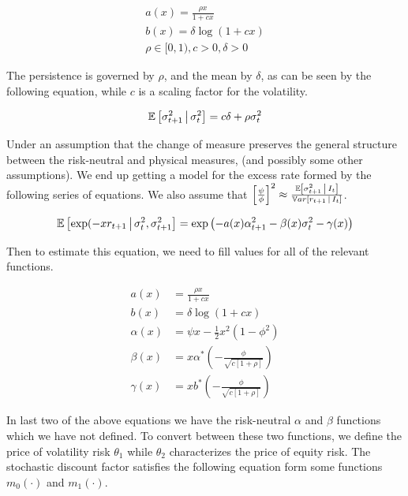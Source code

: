 \documentclass[11pt]{article}
\newcommand*{\E}{\mathbb{E}}
\newcommand*{\Var}{\mathbb{V}ar}
\newcommand{\mvert}[1][\middle]{\ensuremath{\,#1\vert\,}}
\begin{document}
\begin{gather}
    a(x) = \frac{\rho x}{1 + c x}  \\
    b(x) = \delta \log \left(1 + c x\right) \\
    \rho \in [0, 1), c > 0, \delta > 0 
\end{gather}

The persistence is governed by $\rho$, and the mean by $\delta$, as can be seen by the following equation, while
$c$ is a scaling factor for the volatility. 

\begin{equation}
    \E\left[\sigma^2_{t+1} \mvert \sigma^2_t\right] = c \delta + \rho \sigma^2_t
\end{equation}

Under an assumption that the change of measure preserves the general structure between the risk-neutral and
physical measures, (and possibly some other assumptions).
We end up getting a model for the excess rate formed by the following series of equations.   
We also assume that $\left[ \frac{\psi}{\phi} \right]^2 \approx \frac{\E \left[\sigma^2_{t+1} \mvert
I_t\right]}{\Var\left[r_{t+1} \mvert I_t\right]}$.

\begin{equation}
    \E\left[\exp(-x r_{t+1} \mvert \sigma_t^2, \sigma^2_{t+1}\right] = \exp\left(- a(x) \alpha^2_{t+1} - \beta(x)
        \sigma^2_t - \gamma(x) \right) 
\end{equation}

Then to estimate this equation, we need to fill values for all of the relevant functions.


\begin{align}
    a(x) &= \frac{\rho x}{1 + c x} \\
    b(x) &= \delta \log \left(1 + c x\right) \\
    \alpha(x) &= \psi x - \frac{1}{2} x^2 (1 - \phi^2) \\
    \beta(x)  &= x \alpha^{*}\left(- \frac{\phi}{\sqrt{c [1 + \rho]}} \right) \\
    \gamma(x) &= x b^{*}\left(- \frac{\phi}{\sqrt{c [1 + \rho]}}\right) 
\end{align}

In last two of the above equations we have the risk-neutral $\alpha$ and $\beta$ functions which we have not
defined.
To convert between these two functions, we define the price of volatility risk $\theta_1$ while $\theta_2$
characterizes the price of equity risk. 
The stochastic discount factor satisfies the following equation form some functions $m_0(\cdot)$ and
$m_1(\cdot)$.
\end{document}
